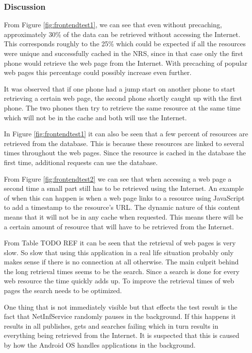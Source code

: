 \subsubsection{Discussion}

From Figure \ref{fig:frontendtest1}, we can see that even without precaching, approximately 30\% of the data can be retrieved without accessing the Internet. This corresponds roughly to the 25\% which could be expected if all the resources were unique and successfully cached in the NRS, since in that case only the first phone would retrieve the web page from the Internet. With precaching of popular web pages this percentage could possibly increase even further.

It was observed that if one phone had a jump start on another phone to start retrieving a certain web page, the second phone shortly caught up with the first phone. The two phones then try to retrieve the same resource at the same time which will not be in the cache and both will use the Internet.

In Figure \ref{fig:frontendtest1} it can also be seen that a few percent of resources are retrieved from the database. This is because these resources are linked to several times throughout the web pages. Since the resource is cached in the database the first time, additional requests can use the database.

From Figure \ref{fig:frontendtest2} we can see that when accessing a web page a second time a small part still has to be retrieved using the Internet. An example of when this can happen is when a web page links to a resource using JavaScript to add a timestamp to the resource's URL. The dynamic nature of this content means that it will not be in any cache when requested. This means there will be a certain amount of resource that will have to be retrieved from the Internet.

From Table TODO REF it can be seen that the retrieval of web pages is very slow. So slow that using this application in a real life situation probably only makes sense if there is no connection at all otherwise. The main culprit behind the long retrieval times seems to be the search. Since a search is done for every web resource the time quickly adds up. To improve the retrieval times of web pages the search needs to be optimized.

One thing that is not immediately visible but that effects the test result is the fact that NetInfService randomly pauses in the background. If this happens it results in all publishes, gets and searches failing which in turn results in everything being retrieved from the Internet. It is suspected that this is caused by how the Android OS handles applications in the background.